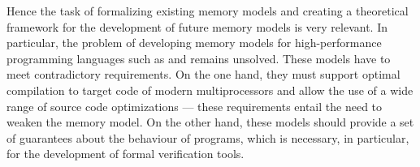 Hence the task of formalizing existing memory models and creating a theoretical framework for the development of future memory models is very relevant. In particular, the problem of developing memory models for high-performance programming languages such as \CPP and \Java remains unsolved.
These models have to meet contradictory requirements.
On the one hand, they must support optimal compilation to target code of modern multiprocessors and allow the use of a wide range of source code optimizations --- these requirements entail the need to weaken the memory model.
On the other hand, these models should provide a set of guarantees about the behaviour of programs, which is necessary, in particular, for the development of formal verification tools.

